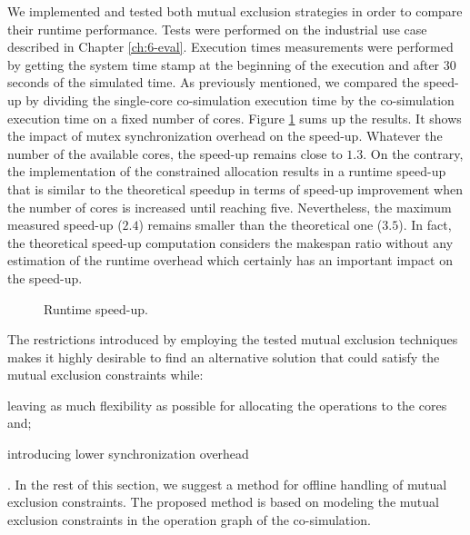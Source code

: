 We implemented and tested both mutual exclusion strategies in order to compare their runtime performance. Tests were performed on the industrial use case described in Chapter \ref{ch:6-eval}. Execution times measurements were performed by getting the system time stamp at the beginning of the execution and after $30$ seconds of the simulated time. As previously mentioned, we compared the speed-up by dividing the single-core co-simulation execution time by the co-simulation execution time on a fixed number of cores. Figure \ref{fig:real-speedup} sums up the results. It shows the impact of mutex synchronization overhead on the speed-up. Whatever the number of the available cores, the speed-up remains close to $1.3$. On the contrary, the implementation of the constrained allocation results in a runtime speed-up that is similar to the theoretical speedup in terms of speed-up improvement when the number of cores is increased until reaching five. Nevertheless, the maximum measured speed-up ($2.4$) remains smaller than the theoretical one ($3.5$). In fact, the theoretical speed-up computation considers the makespan ratio without any estimation of the runtime overhead which certainly has an important impact on the speed-up.


\begin{figure}[phbt]
\centering

\caption{Runtime speed-up.}
\label{fig:real-speedup}
\end{figure}


The restrictions introduced by employing the tested mutual exclusion techniques makes it highly desirable to find an alternative solution that could satisfy the mutual exclusion constraints while: \begin{inlinelist} \item leaving as much flexibility as possible for allocating the operations to the cores and; \item introducing lower synchronization overhead \end{inlinelist}. In the rest of this section, we suggest a method for offline handling of mutual exclusion constraints. The proposed method is based on modeling the mutual exclusion constraints in the operation graph of the co-simulation.

